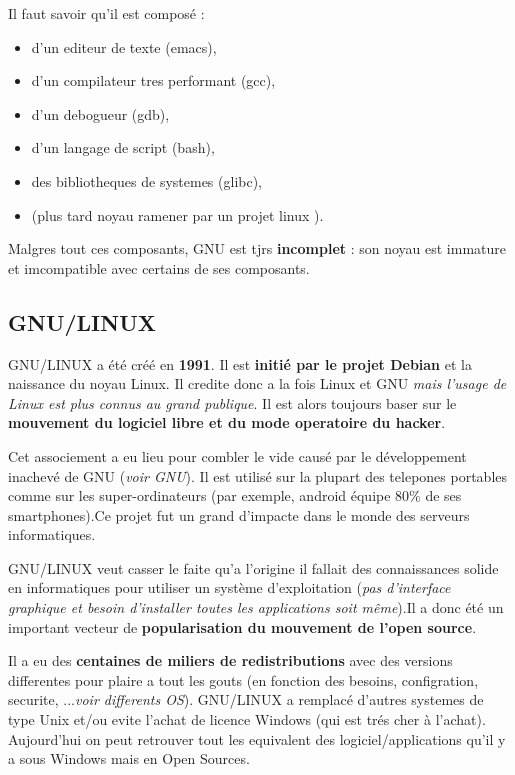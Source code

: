 Il faut savoir qu'il est composé : 
\begin{itemize}
	\item d'un editeur de texte (emacs),
	\item d'un compilateur tres performant (gcc),
	\item d'un debogueur (gdb), 
	\item d'un langage de script (bash),
	\item des bibliotheques de systemes (glibc),  
	\item (plus tard noyau ramener par un projet linux ). 
\end{itemize}
Malgres tout ces composants, GNU est tjrs \textbf{incomplet} : son noyau est immature et imcompatible avec certains de ses composants. \newline



\subsection{GNU/LINUX}

GNU/LINUX a été créé en \textbf{1991}. Il est \textbf{initié par le projet Debian} et la naissance du noyau Linux. Il credite donc a la fois Linux et GNU \textit{mais l'usage de Linux est plus connus au grand publique}. Il est alors toujours baser sur le \textbf{mouvement du logiciel libre et du mode operatoire du hacker}. 

Cet associement a eu lieu pour combler le vide causé par le développement inachevé de GNU (\textit{voir GNU}). Il est utilisé sur la plupart des telepones portables comme sur les super-ordinateurs (par exemple, android équipe 80\% de ses smartphones).Ce projet fut un grand d'impacte dans le monde des serveurs informatiques.

GNU/LINUX veut casser le faite qu'a l'origine il fallait des connaissances solide en informatiques pour utiliser un système d'exploitation (\textit{pas d'interface graphique et besoin d'installer toutes les applications soit même}).Il a donc été un important vecteur de \textbf{popularisation du mouvement de l'open source}.

Il a eu des \textbf{centaines de miliers de redistributions} avec des versions differentes pour plaire a tout les gouts (en fonction des besoins, configration, securite, ...\textit{voir differents OS}). GNU/LINUX a remplacé d'autres systemes de type Unix et/ou evite l'achat de licence Windows (qui est trés cher à l'achat). Aujourd'hui on peut retrouver tout les equivalent des logiciel/applications qu'il y a sous Windows mais en Open Sources.\newline
